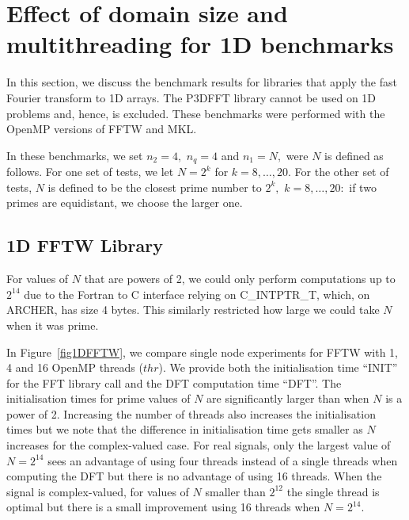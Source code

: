 \documentclass[a4paper]{article}
\begin{document}
\section{Effect of domain size and multithreading for 1D benchmarks}\label{Sec:1DMulti}

In this section, we discuss the benchmark results for libraries that
apply the fast Fourier transform to 1D arrays.  The P3DFFT library
cannot be used on 1D problems and, hence, is excluded. These
benchmarks were performed with the OpenMP versions of FFTW and MKL.

In these benchmarks, we set $n_2=4,$ $n_q=4$ and $n_1=N,$ were $N$ is
defined as follows.  For one set of tests, we let $N=2^k$ for
$k=8,\ldots,20.$ For the other set of tests, $N$ is defined to be the
closest prime number to $2^k,$ $k=8,\ldots,20:$ if two primes are
equidistant, we choose the larger one.


\subsection{1D FFTW Library}\label{Sec:1DFFTW}
For values of $N$ that are powers of 2, we could only perform
computations up to $2^{14}$ due to the Fortran to C interface relying on
C\_INTPTR\_T, which, on ARCHER, has size 4 bytes. This similarly
restricted how large we could take $N$ when it was prime.

In Figure~\ref{fig1DFFTW}, we compare single node experiments for FFTW
with 1, 4 and 16 OpenMP threads ($thr$). We provide both the initialisation
time ``INIT'' for the FFT library call and the DFT computation time
``DFT''.  The initialisation times for prime values of $N$ are
significantly larger than when $N$ is a power of 2. Increasing the
number of threads also increases the initialisation times but we note
that the difference in initialisation time gets smaller as $N$
increases for the complex-valued case. For real signals, only the
largest value of $N=2^{14}$ sees an advantage of using four threads
instead of a single threads when computing the DFT but there is no
advantage of using 16 threads. When the signal is complex-valued, for
values of $N$ smaller than $2^{12}$ the single thread is optimal but
there is a small improvement using 16 threads when $N=2^{14}$.
\end{document}
